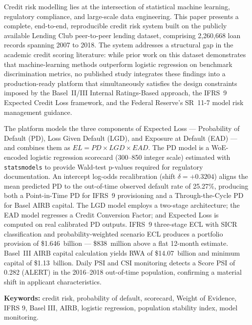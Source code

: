 \documentclass[12pt,a4paper]{report}
\begin{document}
Credit risk modelling lies at the intersection of statistical machine learning, regulatory compliance, and large-scale data engineering. This paper presents a complete, end-to-end, reproducible credit risk system built on the publicly available Lending Club peer-to-peer lending dataset, comprising 2,260,668 loan records spanning 2007 to 2018. The system addresses a structural gap in the academic credit scoring literature: while prior work on this dataset demonstrates that machine-learning methods outperform logistic regression on benchmark discrimination metrics, no published study integrates these findings into a production-ready platform that simultaneously satisfies the design constraints imposed by the Basel~II/III Internal Ratings-Based approach, the IFRS~9 Expected Credit Loss framework, and the Federal Reserve's SR~11-7 model risk management guidance.

The platform models the three components of Expected Loss --- Probability of Default (PD), Loss Given Default (LGD), and Exposure at Default (EAD) --- and combines them as $EL = PD \times LGD \times EAD$. The PD model is a WoE-encoded logistic regression scorecard (300--850 integer scale) estimated with \texttt{statsmodels} to provide Wald-test p-values required for regulatory documentation. An intercept log-odds recalibration (shift $\delta = +0.3204$) aligns the mean predicted PD to the out-of-time observed default rate of 25.27\%, producing both a Point-in-Time PD for IFRS~9 provisioning and a Through-the-Cycle PD for Basel AIRB capital. The LGD model employs a two-stage architecture; the EAD model regresses a Credit Conversion Factor; and Expected Loss is computed on real calibrated PD outputs. IFRS~9 three-stage ECL with SICR classification and probability-weighted scenario ECL produces a portfolio provision of \$1.646~billion --- \$838~million above a flat 12-month estimate. Basel~III AIRB capital calculation yields RWA of \$14.07~billion and minimum capital of \$1.13~billion. Daily PSI and CSI monitoring detects a Score PSI of 0.282 (ALERT) in the 2016--2018 out-of-time population, confirming a material shift in applicant characteristics.

\vspace{0.5em}
\noindent\textbf{Keywords:} credit risk, probability of default, scorecard, Weight of Evidence, IFRS 9, Basel III, AIRB, logistic regression, population stability index, model monitoring.

\tableofcontents
\listoffigures
\listoftables

\end{document}
